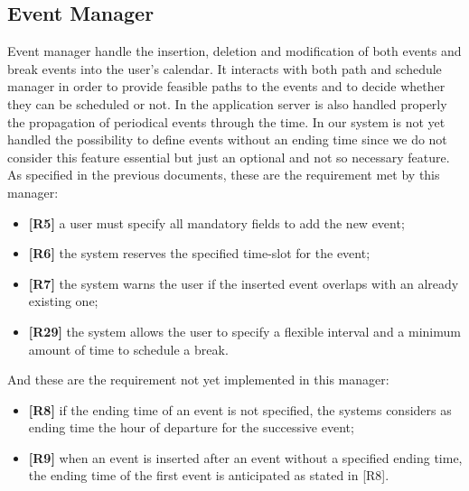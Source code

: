 \subsection{Event Manager}
Event manager handle the insertion, deletion and modification of both events and break events into the user's calendar.
It interacts with both path and schedule manager in order to provide feasible paths to the events and to decide whether they can be scheduled or not.
In the application server is also handled properly the propagation of periodical events through the time.
In our system is not yet handled the possibility to define events without an ending time since we do not consider this feature essential but just an optional and not so necessary feature. 
As specified in the previous documents, these are the requirement met by this manager:
\begin{itemize}
	\item \textbf{[R5]} a user must specify all mandatory fields to add the new event;
	\item \textbf{[R6]} the system reserves the specified time-slot for the event;
	\item \textbf{[R7]} the system warns the user if the inserted event overlaps with an already existing one;
	\item \textbf{[R29]} the system allows the user to specify a flexible interval and a minimum amount of time to schedule a break.
\end{itemize}
And these are the requirement not yet implemented in this manager:
\begin{itemize}
	\item \textbf{[R8]} if the ending time of an event is not specified, the systems considers as ending time the hour of departure for the successive event;
	\item \textbf{[R9]} when an event is inserted after an event without a specified ending time, the ending time  of the first event is anticipated as stated in [R8].
\end{itemize}

